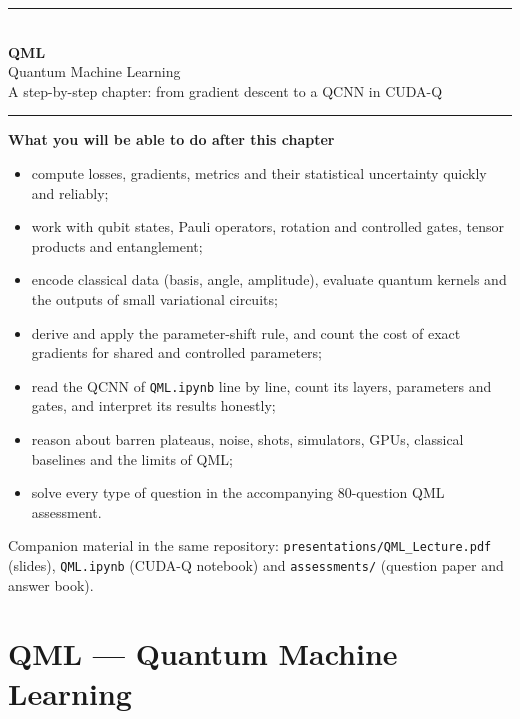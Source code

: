 \documentclass[11pt,a4paper,openany]{book}
\begin{document}
\begin{titlepage}
\centering
{\color{brand}\rule{\linewidth}{1.5pt}}\\[10pt]
{\Huge\bfseries\color{brand} QML}\\[8pt]
{\LARGE Quantum Machine Learning}\\[6pt]
{\large A step-by-step chapter: from gradient descent to a QCNN in CUDA-Q}\\[6pt]
{\color{brand}\rule{\linewidth}{1.5pt}}
\vspace{18mm}

\begin{minipage}{0.86\linewidth}
\large
\textbf{What you will be able to do after this chapter}
\begin{itemize}[itemsep=3pt]
\item compute losses, gradients, metrics and their statistical uncertainty quickly and reliably;
\item work with qubit states, Pauli operators, rotation and controlled gates, tensor products and entanglement;
\item encode classical data (basis, angle, amplitude), evaluate quantum kernels and the outputs of small variational circuits;
\item derive and apply the parameter-shift rule, and count the cost of exact gradients for shared and controlled parameters;
\item read the QCNN of \texttt{QML.ipynb} line by line, count its layers, parameters and gates, and interpret its results honestly;
\item reason about barren plateaus, noise, shots, simulators, GPUs, classical baselines and the limits of QML;
\item solve every type of question in the accompanying 80-question QML assessment.
\end{itemize}
\end{minipage}
\vfill
{\small Companion material in the same repository: \texttt{presentations/QML\_Lecture.pdf} (slides),
\texttt{QML.ipynb} (CUDA-Q notebook) and \texttt{assessments/} (question paper and answer book).}
\end{titlepage}

\tableofcontents
\setcounter{chapter}{0}
\chapter*{QML --- Quantum Machine Learning}
\end{document}
